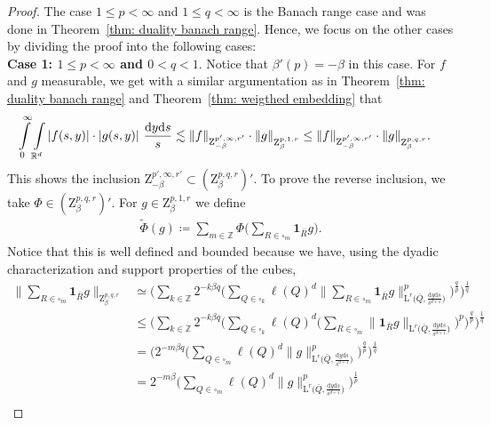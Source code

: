 \documentclass[10pt,a4paper]{amsart}
\newcommand{\IR}{\mathbb{R}}
\newcommand{\IZ}{\mathbb{Z}}
\renewcommand{\L}{\mathrm{L}}
\newcommand{\Z}{\mathrm{Z}}
\renewcommand{\d}{\mathrm{d}}
\begin{document}
\begin{proof}
    The case $1\leq p<\infty$ and $1\leq q<\infty$ is the Banach range case and was done in Theorem~\ref{thm: duality banach range}. Hence, we focus on the other cases by dividing the proof into the following cases:\\

    \noindent \textbf{Case 1: $1\leq p<\infty$ and $0< q<1$}. Notice that $\beta'(p)=-\beta$ in this case. For $f$ and $g$ measurable,
    we get with a similar argumentation as in Theorem~\ref{thm: duality banach range} and Theorem~\ref{thm: weigthed embedding} that
    \begin{align*}
        \int\limits_0^\infty \int\limits_{\IR^d} |f(s,y)|\cdot |g(s,y)| \ \frac{\d y \d s }{s} &\lesssim  \|f\|_{\Z^{p', \infty,r'}_{-\beta}}\cdot\|g\|_{\Z^{\vphantom{p',q',r'}p,1,r}_\beta} \leq \|f\|_{\Z^{p', \infty,r'}_{-\beta}}\cdot \|g\|_{\Z^{\vphantom{p',q',r'}p,q,r}_\beta} .
    \end{align*}
    This shows the inclusion $\Z^{p', \infty,r'}_{-\beta}\subset (\Z^{p,q,r}_\beta)'$. To prove the reverse inclusion, we take $\Phi \in (\Z^{p,q,r}_\beta)'$. For $g\in \Z^{p,1,r}_\beta$ we define
    \begin{align*}
        \tilde \Phi (g) \coloneqq \sum\limits_{m\in\IZ} \Phi\Big(\sum\limits_{R\in\square_m} \mathbf{1}_{\bar R}g \Big).
    \end{align*}
    Notice that this is well defined and bounded because we have, using the dyadic characterization and support properties of the cubes,
    \begin{align*}
        \Big\|\sum\limits_{R\in\square_m} \mathbf{1}_{\bar R}g  \Big\|_{\Z^{p,q,r}_\beta} &\simeq \Big( \sum\limits_{k\in\IZ}2^{-k\beta q} \Big(\sum\limits_{Q\in\square_k} \ell(Q)^d \Big\|\sum\limits_{R\in\square_m} \mathbf{1}_{\bar R}g\Big\|_{\L^r\big(\bar Q, \frac{\d y \d s}{s^{d+1}}\big)}^p\Big)^\frac{q}{p}\Big)^\frac{1}{q}\\
        &\leq\Big( \sum\limits_{k\in\IZ}2^{-k\beta q} \Big(\sum\limits_{Q\in\square_k} \ell(Q)^d \Big(\sum\limits_{R\in\square_m} \|\mathbf{1}_{\bar R}g\|_{\L^r\big(\bar Q, \frac{\d y \d s}{s^{d+1}}\big)}\Big)^p\Big)^\frac{q}{p}\Big)^\frac{1}{q}\\
        &=\Big(2^{-m\beta q} \Big(\sum\limits_{Q\in\square_m} \ell(Q)^d \|g\|_{\L^r\big(\bar Q, \frac{\d y \d s}{s^{d+1}}\big)}^p\Big)^\frac{q}{p}\Big)^\frac{1}{q}\\
        &=2^{-m\beta } \Big(\sum\limits_{Q\in\square_m} \ell(Q)^d \|g\|_{\L^r\big(\bar Q, \frac{\d y \d s}{s^{d+1}}\big)}^p\Big)^\frac{1}{p}\\

\end{align*}
\end{proof}
\end{document}
